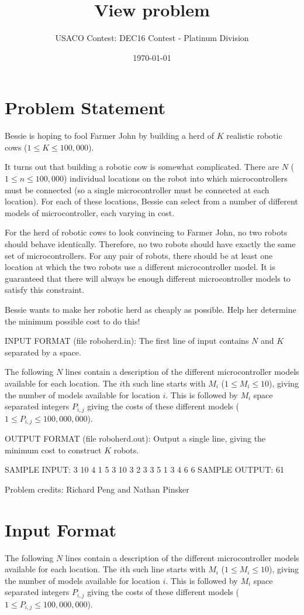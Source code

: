 \documentclass[12pt]{article}
\title{View problem}
\author{USACO Contest: DEC16 Contest - Platinum Division}
\date{\today}
\begin{document}
\maketitle

\section*{Problem Statement}

Bessie is hoping to fool Farmer John by building a herd of $K$ realistic robotic
cows ($1 \leq K \leq 100,000$).

It turns out that building a robotic cow is somewhat complicated.
There are $N$ ($1 \leq n \leq 100,000$) individual locations on the
robot into which microcontrollers must be connected (so a single
microcontroller must be connected at each location).  For each of
these locations, Bessie can select from a number of different models
of microcontroller, each varying in cost.  

For the herd of robotic cows to look convincing to Farmer John, no two robots
should behave identically.  Therefore, no two robots should have exactly the
same set of microcontrollers. For any pair of robots, there should be at least
one location at which the two robots use a  different microcontroller model.  It
is guaranteed that there will always be enough different microcontroller models
to satisfy this constraint.

Bessie wants to make her robotic herd as cheaply as possible.  Help her
determine the  minimum possible cost to do this! 

INPUT FORMAT (file roboherd.in):
The first line of input contains $N$ and $K$ separated by a space.

The following $N$ lines contain a description of the different microcontroller
models available for each location.  The $i$th such line starts with $M_i$
($1 \leq M_i \leq 10$), giving the number of models available for location $i$. 
This is followed by $M_i$ space separated integers $P_{i,j}$ giving the costs of
these different models ($1 \le P_{i,j} \le 100,000,000$).

OUTPUT FORMAT (file roboherd.out):
Output a single line, giving the minimum cost to construct $K$ robots.

SAMPLE INPUT:
3 10
4 1 5 3 10
3 2 3 3
5 1 3 4 6 6
SAMPLE OUTPUT: 
61


Problem credits: Richard Peng and Nathan Pinsker



\section*{Input Format}
The following $N$ lines contain a description of the different microcontroller
models available for each location.  The $i$th such line starts with $M_i$
($1 \leq M_i \leq 10$), giving the number of models available for location $i$. 
This is followed by $M_i$ space separated integers $P_{i,j}$ giving the costs of
these different models ($1 \le P_{i,j} \le 100,000,000$).
\end{document}
